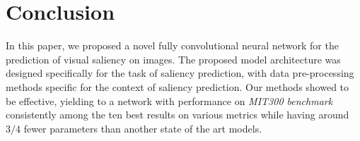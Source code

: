 \documentclass[journal]{IEEEtran}
\begin{document}
\section{Conclusion}
In this paper, we proposed a novel fully convolutional neural network for the
prediction of visual saliency on images.
The proposed model architecture was designed specifically
for the task of saliency prediction, with data pre-processing methods
specific for the context of saliency prediction.
Our methods showed to be effective, yielding to a network with performance
on \emph{MIT300 benchmark} consistently among the ten best results on various
metrics while having around $3/4$  fewer parameters than another state of
the art models.

{\small


}
\end{document}
